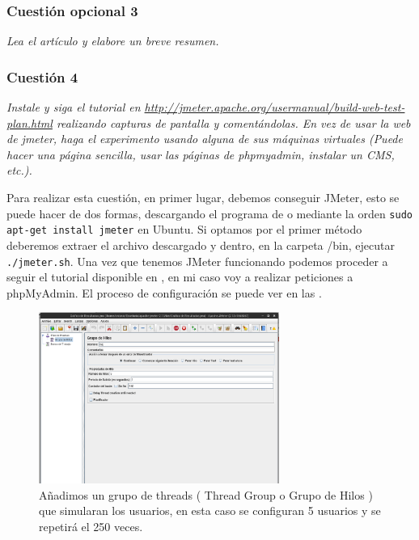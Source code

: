 \subsubsection{Cuestión opcional 3}
\textit{Lea el artículo y elabore un breve resumen.}

\subsubsection{Cuestión 4}
\textit{Instale y siga el tutorial en \url{http://jmeter.apache.org/usermanual/build-web-test-plan.html} realizando capturas de pantalla y comentándolas. En vez de usar la web de jmeter, haga el experimento usando alguna de sus máquinas virtuales (Puede hacer una página sencilla, usar las páginas de phpmyadmin, instalar un CMS, etc.).}
\newline

Para realizar esta cuestión, en primer lugar, debemos conseguir JMeter, esto se puede hacer de dos formas, descargando el programa de \cite{jm} o mediante la orden \texttt{sudo apt-get install jmeter} en Ubuntu. Si optamos por el primer método deberemos extraer el archivo descargado y dentro, en la carpeta /bin, ejecutar \texttt{./jmeter.sh}. Una vez que tenemos JMeter funcionando podemos proceder a seguir el tutorial disponible en \cite{tut}, en mi caso voy a realizar peticiones a phpMyAdmin. El proceso de configuración se puede ver en las .

\begin{figure}[H]
  \begin{center}
    \includegraphics[width=0.7\textwidth]{imagenes/jm1}
    \caption{Añadimos un grupo de threads ( Thread Group o Grupo de Hilos ) que simularan los usuarios, en esta caso se configuran 5 usuarios y se repetirá el 250 veces.}
    \label{fig7}
  \end{center}
\end{figure}

